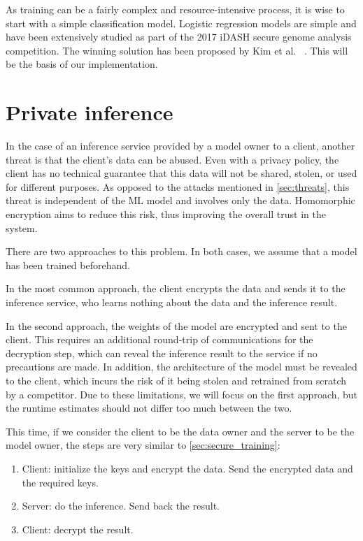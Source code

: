 \documentclass[a4paper,11pt,oneside]{report}
\begin{document}
As training can be a fairly complex and resource-intensive process, it is wise to start with a simple classification model. Logistic regression models are simple and have been extensively studied as part of the 2017 iDASH secure genome analysis competition. The winning solution has been proposed by Kim et al. ~\cite{kim_logistic_2018}. This will be the basis of our implementation.


\section{Private inference}

In the case of an inference service provided by a model owner to a client, another threat is that the client's data can be abused. Even with a privacy policy, the client has no technical guarantee that this data will not be shared, stolen, or used for different purposes. As opposed to the attacks mentioned in \autoref{sec:threats}, this threat is independent of the ML model and involves only the data. Homomorphic encryption aims to reduce this risk, thus improving the overall trust in the system.

There are two approaches to this problem. In both cases, we assume that a model has been trained beforehand. 

In the most common approach, the client encrypts the data and sends it to the inference service, who learns nothing about the data and the inference result.

In the second approach, the weights of the model are encrypted and sent to the client. This requires an additional round-trip of communications for the decryption step, which can reveal the inference result to the service if no precautions are made. In addition, the architecture of the model must be revealed to the client, which incurs the risk of it being stolen and retrained from scratch by a competitor. Due to these limitations, we will focus on the first approach, but the runtime estimates should not differ too much between the two.

This time, if we consider the client to be the data owner and the server to be the model owner, the steps are very similar to \autoref{sec:secure_training}:
\begin{enumerate}
    \item Client: initialize the keys and encrypt the data. Send the encrypted data and the required keys.
    \item Server: do the inference. Send back the result.
    \item Client: decrypt the result.
\end{enumerate}
\end{document}
